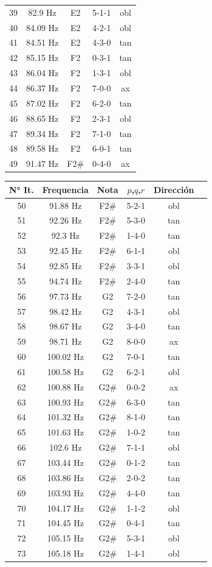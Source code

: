 \begin{table}[H]
\begin{tabular}{|c|c|c|c|c|}
39&82.9 Hz&E2&5-1-1&obl\\
40&84.09 Hz&E2&4-2-1&obl\\
41&84.51 Hz&E2&4-3-0&tan\\
42&85.15 Hz&F2&0-3-1&tan\\
43&86.04 Hz&F2&1-3-1&obl\\
44&86.37 Hz&F2&7-0-0&ax\\
45&87.02 Hz&F2&6-2-0&tan\\
46&88.65 Hz&F2&2-3-1&obl\\
47&89.34 Hz&F2&7-1-0&tan\\
48&89.58 Hz&F2&6-0-1&tan\\
49&91.47 Hz&F2\#&0-4-0&ax\\
\hline
    \end{tabular}
    \quad
    \begin{tabular}{|c|c|c|c|c|c|}
    \hline
N° It. & Frequencia & Nota & $p$,$q$,$r$ & Dirección \\
\hline \hline
50&91.88 Hz&F2\#&5-2-1&obl\\
51&92.26 Hz&F2\#&5-3-0&tan\\
52&92.3 Hz&F2\#&1-4-0&tan\\
53&92.45 Hz&F2\#&6-1-1&obl\\
54&92.85 Hz&F2\#&3-3-1&obl\\
55&94.74 Hz&F2\#&2-4-0&tan\\
56&97.73 Hz&G2&7-2-0&tan\\
57&98.42 Hz&G2&4-3-1&obl\\
58&98.67 Hz&G2&3-4-0&tan\\
59&98.71 Hz&G2&8-0-0&ax\\
60&100.02 Hz&G2&7-0-1&tan\\
61&100.58 Hz&G2&6-2-1&obl\\
62&100.88 Hz&G2\#&0-0-2&ax\\
63&100.93 Hz&G2\#&6-3-0&tan\\
64&101.32 Hz&G2\#&8-1-0&tan\\
65&101.63 Hz&G2\#&1-0-2&tan\\
66&102.6 Hz&G2\#&7-1-1&obl\\
67&103.44 Hz&G2\#&0-1-2&tan\\
68&103.86 Hz&G2\#&2-0-2&tan\\
69&103.93 Hz&G2\#&4-4-0&tan\\
70&104.17 Hz&G2\#&1-1-2&obl\\
71&104.45 Hz&G2\#&0-4-1&tan\\
72&105.15 Hz&G2\#&5-3-1&obl\\
73&105.18 Hz&G2\#&1-4-1&obl\\

\end{tabular}
\end{table}
